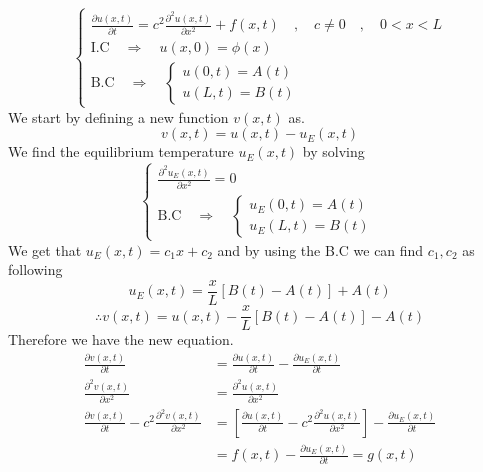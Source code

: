\begin{equation}
    \begin{cases}
        \displaystyle \frac{\partial u(x,t)}{\partial t} = c^2 \frac{\partial^2 u(x,t)}{\partial x^2} + f(x,t) \quad,\quad c\neq 0 \quad,\quad 0<x<L
        \\
        \text{I.C} \quad \Longrightarrow \quad u(x,0) = \phi(x)
        \\
        \text{B.C} \quad \Longrightarrow \quad
        \begin{cases}
            u(0,t) = A(t)
            \\
            u(L,t) = B(t)        
        \end{cases}  
    \end{cases}
\end{equation}
We start by defining a new function $v(x,t)$ as.
\[
v(x,t) = u(x,t) - u_E(x,t)    
\]
We find the equilibrium temperature $u_E(x,t)$ by solving 
\begin{equation}
    \begin{cases}
        \displaystyle \frac{\partial^2 u_E(x,t)}{\partial x^2}  = 0
        \\
        \text{B.C} \quad \Longrightarrow \quad
            \begin{cases}
                u_E(0,t) = A(t)
                \\
                u_E(L,t) = B(t)        
            \end{cases} 
    \end{cases}
\end{equation}
We get that $u_E(x,t) = c_1 x + c_2$ and by using the B.C we can find $c_1,c_2$ as following
\[
u_E(x,t) = \frac{x}{L}[B(t)-A(t)] +A(t)    
\]
\begin{equation}
\therefore v(x,t) = u(x,t) -  \frac{x}{L}[B(t)-A(t)] -A(t)
\end{equation}
Therefore we have the new equation.
\begin{align*}
\frac{\partial v(x,t)}{\partial t} &= \frac{\partial u(x,t)}{\partial t} - \frac{\partial u_E(x,t)}{\partial t}
\\
\frac{\partial^2 v(x,t)}{\partial x^2} &= \frac{\partial^2 u(x,t)}{\partial x^2}
\\
\frac{\partial v(x,t)}{\partial t} - c^2 \frac{\partial^2 v(x,t)}{\partial x^2} &= \left[ \frac{\partial u(x,t)}{\partial t} - c^2 \frac{\partial^2 u(x,t)}{\partial x^2}\right] - \frac{\partial u_E(x,t)}{\partial t}
\\
&= f(x,t) - \frac{\partial u_E(x,t)}{\partial t} = g(x,t)
\end{align*}
